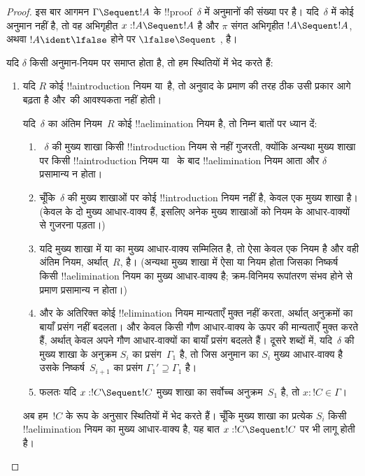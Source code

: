 \documentclass[../../../include/open-logic-section]{subfiles}
\begin{document}
\begin{proof}
इस बार आगमन $\Gamma \Sequent !A$ के !!{proof}~$\delta$ में अनुमानों की संख्या
पर है। यदि~$\delta$ में कोई अनुमान नहीं है, तो वह अभिगृहीत $x:!A \Sequent
!A$ है और $\pi$ संगत अभिगृहीत $!A \Sequent !A$, अथवा $!A \ident \lfalse$
होने पर $\lfalse \Sequent \ $, है।

यदि $\delta$ किसी अनुमान-नियम पर समाप्त होता है, तो हम स्थितियों में भेद करते
हैं:
\begin{enumerate}
  \item यदि $R$ कोई !!a{introduction} नियम या~\FalseInt है, तो अनुवाद
   के प्रमाण की तरह ठीक उसी प्रकार आगे बढ़ता
  है और~\Cut की आवश्यकता नहीं होती।

  यदि~$\delta$ का अंतिम नियम~$R$ कोई !!a{elimination} नियम है, तो निम्न बातों
  पर ध्यान दें:
  \begin{enumerate}
    \item~$\delta$ की मुख्य शाखा किसी !!{introduction} नियम से नहीं गुजरती,
    क्योंकि अन्यथा मुख्य शाखा पर किसी !!a{introduction} नियम या~\FalseInt{}
    के बाद !!a{elimination} नियम आता और $\delta$ प्रसामान्य न होता।
    \item चूँकि~$\delta$ की मुख्य शाखाओं पर कोई !!{introduction} नियम नहीं
    है, केवल एक मुख्य शाखा है। (केवल \Intro{\land} के दो मुख्य आधार-वाक्य
    हैं, इसलिए अनेक मुख्य शाखाओं को \Intro{\land} नियम के आधार-वाक्यों से
    गुजरना पड़ता।)
    \item यदि मुख्य शाखा में \Elim{\lor} या \Elim{\lexists} का मुख्य
    आधार-वाक्य सम्मिलित है, तो ऐसा केवल एक नियम है और वही अंतिम नियम,
    अर्थात्~$R$, है। (अन्यथा मुख्य शाखा में ऐसा \Elim{\lor} या
    \Elim{\lexists} नियम होता जिसका निष्कर्ष किसी !!a{elimination} नियम का
    मुख्य आधार-वाक्य है; क्रम-विनिमय रूपांतरण संभव होने से प्रमाण प्रसामान्य
    न होता।)
  \item \Elim{\lor} और \Elim{\lexists} के अतिरिक्त कोई !!{elimination} नियम
  मान्यताएँ मुक्त नहीं करता, अर्थात् अनुक्रमों का बायाँ प्रसंग नहीं बदलता।
  \Elim{\lor} और \Elim{\lexists} केवल किसी गौण आधार-वाक्य के ऊपर की मान्यताएँ
  मुक्त करते हैं, अर्थात् केवल अपने गौण आधार-वाक्यों का बायाँ प्रसंग बदलते
  हैं। दूसरे शब्दों में, यदि~$\delta$ की मुख्य शाखा के अनुक्रम $S_i$ का
  प्रसंग~$\Gamma_1$ है, तो जिस अनुमान का $S_i$ मुख्य आधार-वाक्य है उसके
  निष्कर्ष~$S_{i+1}$ का प्रसंग $\Gamma_1' \supseteq \Gamma_1$ है।
  \item फलतः यदि $x: !C \Sequent !C$ मुख्य शाखा का सर्वोच्च अनुक्रम~$S_1$
  है, तो $x:!C \in \Gamma$।
  \end{enumerate}
  अब हम~$!C$ के रूप के अनुसार स्थितियों में भेद करते हैं। चूँकि मुख्य शाखा का
  प्रत्येक $S_i$ किसी !!a{elimination} नियम का मुख्य आधार-वाक्य है, यह बात
  $x:!C \Sequent !C$ पर भी लागू होती है।


\end{enumerate}
\end{proof}
\end{document}
